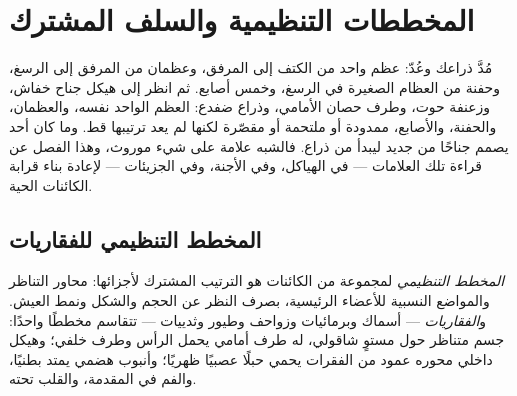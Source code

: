 \chapter{المخططات التنظيمية والسلف المشترك}\label{ch:g10:common-ancestry}

مُدَّ ذراعك وعُدّ: عظم واحد من الكتف إلى المرفق، وعظمان من المرفق إلى
الرسغ، وحفنة من العظام الصغيرة في الرسغ، وخمس أصابع. ثم انظر إلى هيكل
جناح خفاش، وزعنفة حوت، وطرف حصان الأمامي، وذراع ضفدع: العظم الواحد
نفسه، والعظمان، والحفنة، والأصابع، ممدودة أو ملتحمة أو مقصّرة لكنها لم
يعد ترتيبها قط. وما كان أحد يصمم جناحًا من جديد ليبدأ من ذراع. فالشبه
علامة على شيء موروث، وهذا الفصل عن قراءة تلك العلامات --- في الهياكل،
وفي الأجنة، وفي الجزيئات --- لإعادة بناء قرابة الكائنات الحية.

\section{المخطط التنظيمي للفقاريات}

\begin{definition}\label{def:g10:common-ancestry:bodyplan}
\emph{المخطط التنظيمي} لمجموعة من الكائنات هو
الترتيب المشترك لأجزائها: محاور التناظر والمواضع النسبية للأعضاء
الرئيسية، بصرف النظر عن الحجم والشكل ونمط العيش. و\emph{الفقاريات}
 --- أسماك وبرمائيات وزواحف وطيور وثدييات --- تتقاسم
مخططًا واحدًا: جسم متناظر حول مستوٍ شاقولي، له طرف أمامي يحمل الرأس
وطرف خلفي؛ وهيكل داخلي محوره عمود من الفقرات يحمي حبلًا عصبيًا ظهريًا؛
وأنبوب هضمي يمتد بطنيًا، والفم في المقدمة، والقلب تحته.
\end{definition}

